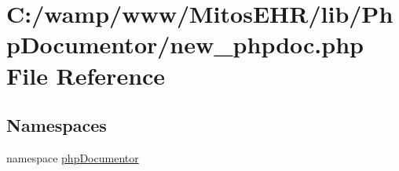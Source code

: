 \hypertarget{new__phpdoc_8php}{\section{\-C\-:/wamp/www/\-Mitos\-E\-H\-R/lib/\-Php\-Documentor/new\-\_\-phpdoc.php \-File \-Reference}
\label{new__phpdoc_8php}
}
\subsection*{\-Namespaces}
\begin{DoxyCompactItemize}
\item 
namespace \hyperlink{namespacephp_documentor}{php\-Documentor}
\end{DoxyCompactItemize}
